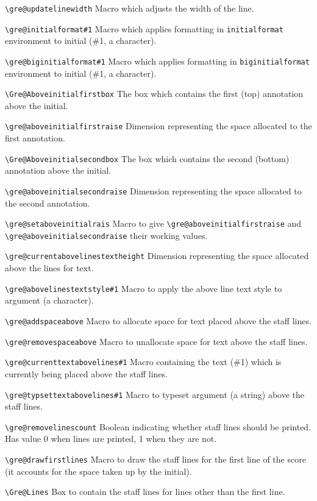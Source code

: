 \verb=\gre@updatelinewidth=%
	Macro which adjusts the width of the line.

\verb=\gre@initialformat#1=%
	Macro which applies formatting in \verb=initialformat= environment to initial (\#1, a character).

\verb=\gre@biginitialformat#1=%
	Macro which applies formatting in \verb=biginitialformat= environment to initial (\#1, a character).

\verb=\Gre@Aboveinitialfirstbox=%
	The box which contains the first (top) annotation above the initial.

\verb=\gre@aboveinitialfirstraise=%
	Dimension representing the space allocated to the first annotation.

\verb=\Gre@Aboveinitialsecondbox=%
	The box which contains the second (bottom) annotation above the initial.

\verb=\gre@aboveinitialsecondraise=%
	Dimension representing the space allocated to the second annotation.

\verb=\gre@setaboveinitialrais=%
	Macro to give \verb=\gre@aboveinitialfirstraise= and \verb=\gre@aboveinitialsecondraise= their working values.
	
\verb=\gre@currentabovelinestextheight=%
	Dimension representing the space allocated above the lines for text.	

\verb=\gre@abovelinestextstyle#1=%
	Macro to apply the above line text style to argument (a character).

\verb=\gre@addspaceabove=%
	Macro to allocate space for text placed above the staff lines.

\verb=\gre@removespaceabove=%
	Macro to unallocate space for text above the staff lines.

\verb=\gre@currenttextabovelines#1=%
	Macro containing the text (\#1) which is currently being placed above the staff lines.

\verb=\gre@typsettextabovelines#1=%
	Macro to typeset argument (a string) above the staff lines.

\verb=\gre@removelinescount=%
	Boolean indicating whether staff lines should be printed.  Has value 0 when lines are printed, 1 when they are not.

\verb=\gre@drawfirstlines=%
	Macro to draw the staff lines for the first line of the score (\ie it accounts for the space taken up by the initial).

\verb=\Gre@Lines=%
	Box to contain the staff lines for lines other than the first line.


